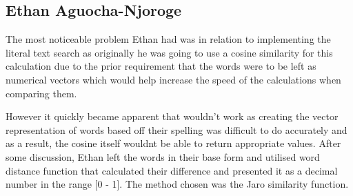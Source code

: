 \subsection{Ethan Aguocha-Njoroge}
The most noticeable problem Ethan had was in relation to implementing the literal text search as originally he was going to use a cosine similarity for this calculation due to the prior requirement that the words were to be left as numerical vectors which would help increase the speed of the calculations when comparing them.

However it quickly became apparent that wouldn’t work as creating the vector representation of words based off their spelling was difficult to do accurately and as a result, the cosine itself wouldnt be able to return appropriate values.
After some discussion, Ethan left the words in their base form and utilised word distance function that calculated their difference and presented it as a decimal number in the range [0 - 1].
The method chosen was the Jaro similarity function.
